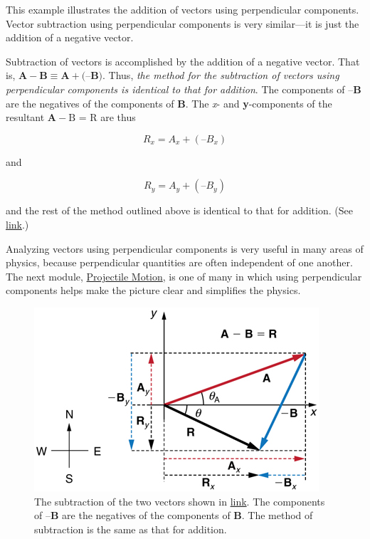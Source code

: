 \documentclass[
]{book}
\begin{document}
This example illustrates the addition of vectors using perpendicular
components. Vector subtraction using perpendicular components is very
similar---it is just the addition of a negative vector.

Subtraction of vectors is accomplished by the addition of a negative
vector. That is,
\({{{\mathbf{A} - \mathbf{B}} \equiv {{\mathbf{A} + (}\mathbf{–B}}})}{}\).
Thus, \emph{the method for the subtraction of vectors using perpendicular
components is identical to that for addition}. The components of
\(\textbf{–B}{}\) are the negatives of the components of \(\mathbf{B}{}\).
The \emph{x}- and \textbf{y}-components of the resultant
\({\mathbf{A} - \text{B\ =\ R}}{}\) are thus

\leavevmode\hypertarget{eip-772}{}%
\[{R_{x} = {A_{x} + \left( –B_{x} \right)}}{}\]

and

\leavevmode\hypertarget{eip-532}{}%
\[{R_{y} = {A_{y} + \left( –B_{y} \right)}}{}\]

and the rest of the method outlined above is identical to that for
addition. (See
\protect\hyperlink{import-auto-id1165298841604}{link}.)

Analyzing vectors using perpendicular components is very useful in many
areas of physics, because perpendicular quantities are often independent
of one another. The next module, \href{/m54787}{Projectile Motion}, is one of
many in which using perpendicular components helps make the picture
clear and simplifies the physics.

\begin{figure}
\hypertarget{import-auto-id1165298841604}{%
\centering
\includegraphics{images/Figure_03_03_10a.jpg}
\caption{The subtraction of the two vectors shown in
\protect\hyperlink{import-auto-id1165298839640}{link}. The
components of \(\textbf{–B}{}\) are the negatives of the components of
\(\mathbf{B}{}\). The method of subtraction is the same as that for
addition.}\label{import-auto-id1165298841604}
}
\end{figure}
\end{document}
